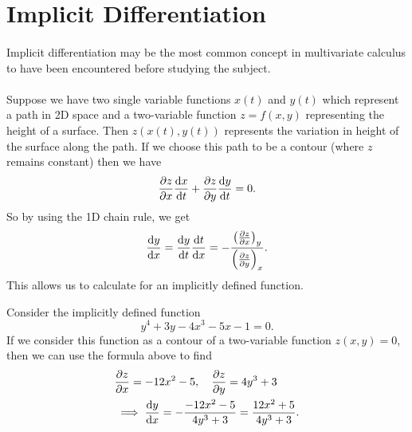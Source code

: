 \documentclass[../multivariate_calculus.tex]{subfiles}
\begin{document}
    \section{Implicit Differentiation}
        \paragraph{}
        Implicit differentiation may be the most common concept in multivariate calculus to have been encountered before studying the subject.
        
        \paragraph{}
        Suppose we have two single variable functions $x(t)$ and $y(t)$ which represent a path in 2D space and a two-variable function $z=f(x,y)$ representing the height of a surface. 
        Then $z(x(t),y(t))$ represents the variation in height of the surface along the path.
        If we choose this path to be a contour (where $z$ remains constant) then we have
        \begin{equation}
            \frac{\partial z}{\partial x}\frac{\mathrm{d}x}{\mathrm{d}t}+\frac{\partial z}{\partial y}\frac{\mathrm{d}y}{\mathrm{d}t}=0.
        \end{equation}
        So by using the 1D chain rule, we get
        \begin{equation}
            \frac{\mathrm{d}y}{\mathrm{d}x}=\frac{\mathrm{d}y}{\mathrm{d}t}\frac{\mathrm{d}t}{\mathrm{d}x}=-\frac{\left(\frac{\partial z}{\partial x}\right)_y}{\left(\frac{\partial z}{\partial y}\right)_x}.
        \end{equation}
        This allows us to calculate  for an implicitly defined function.
        \begin{example}
            Consider the implicitly defined function
            \begin{equation}
                y^4+3y-4x^3-5x-1=0.
            \end{equation}
            If we consider this function as a contour of a two-variable function $z(x,y)=0$, then we can use the formula above to find
            \begin{align}
                &\frac{\partial z}{\partial x}=-12x^2-5,\quad\frac{\partial z}{\partial y}=4y^3+3\\
                &\implies\frac{\mathrm{d}y}{\mathrm{d}x}=-\frac{-12x^2-5}{4y^3+3}=\frac{12x^2+5}{4y^3+3}.
            \end{align}
        \end{example}
\end{document}
